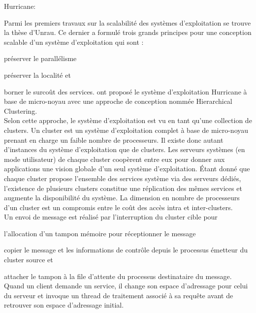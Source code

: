       \begin{paragraph}{Hurricane:}

        Parmi les premiers travaux sur la scalabilité des systèmes
        d’exploitation se trouve la thèse d’Unrau. Ce dernier a formulé trois
        grands principes pour une conception scalable d’un système
        d’exploitation qui sont : \benumline \item préserver le
        parallélisme \item préserver la localité et \item borner le surcoût des
        services\eenumline. \citet{unrau1995hierarchical} ont proposé le système
        d’exploitation Hurricane à base de micro-noyau avec une approche de
        conception nommée Hierarchical Clustering.\\

        Selon cette approche, le système d’exploitation est vu en tant qu’une
        collection de clusters. Un cluster est un système d’exploitation complet
        à base de micro-noyau prenant en charge un faible nombre de
        processeurs. Il existe donc autant d’instances du système d’exploitation
        que de clusters. Les serveurs systèmes (en mode utilisateur) de chaque
        cluster coopèrent entre eux pour donner aux applications une vision
        globale d’un seul système d’exploitation. Étant donné que chaque cluster
        propose l’ensemble des services système via des serveurs dédiés,
        l’existence de plusieurs clusters constitue une réplication des mêmes
        services et augmente la disponibilité du système. La dimension en nombre
        de processeurs d’un cluster est un compromis entre le coût des accès
        intra et inter-clusters.\\

        Un envoi de message est réalisé par l’interruption du cluster cible
        pour\benumline \item l’allocation d’un tampon mémoire pour réceptionner
        le message \item copier le message et les informations de contrôle
        depuis le processus émetteur du cluster source et \item attacher le
        tampon à la file d’attente du processus destinataire du
        message\eenumline. Quand un client demande un service, il change son
        espace d’adressage pour celui du serveur et invoque un thread de
        traitement associé à sa requête avant de retrouver son espace
        d’adressage initial.

      \end{paragraph}
      
